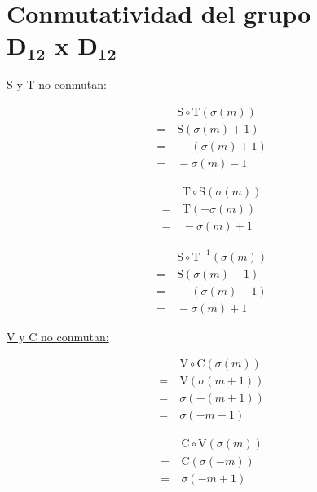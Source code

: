 	\chapter[Conmutatividad del grupo D$_{\textbf{12}}$ x D$_{\textbf{12}}$]{Conmutatividad del grupo \\D$_{\textbf{12}}$ x D$_{\textbf{12}}$}
	\label{app:commm}
	\begin{center}
		
		\underline{S y T no conmutan:}
		\vspace*{-\bigskipamount}
		\begin{multicols}{3}
			\begin{align*}
			&\ \text{S}\circ\text{T}(\sigma(m))\\
			=&\ \text{S}(\sigma(m)+1)\\
			=&\ -(\sigma(m)+1)\\
			=&\ -\sigma(m)-1
			\end{align*}
			
			\begin{align*}
			&\ \text{T}\circ\text{S}(\sigma(m))\\
			=&\ \text{T}(-\sigma(m))\\
			=&\ -\sigma(m)+1
			\end{align*}
			
			\begin{align*}
			&\ \text{S}\circ\text{T}^{-1}(\sigma(m))\\
			=&\ \text{S}(\sigma(m)-1)\\
			=&\ -(\sigma(m)-1)\\
			=&\ -\sigma(m)+1
			\end{align*}
		\end{multicols}
		
		\underline{V y C no conmutan:}
		\vspace*{-\bigskipamount}
		\begin{multicols}{3}
			\begin{align*}
			&\ \text{V}\circ\text{C}(\sigma(m))\\
			=&\ \text{V}(\sigma(m+1))\\
			=&\ \sigma(-(m+1))\\
			=&\ \sigma(-m-1)
			\end{align*}
			
			\begin{align*}
			&\ \text{C}\circ\text{V}(\sigma(m))\\
			=&\ \text{C}(\sigma(-m))\\
			=&\ \sigma(-m+1)
			\end{align*}
			

\end{multicols}
\end{center}
